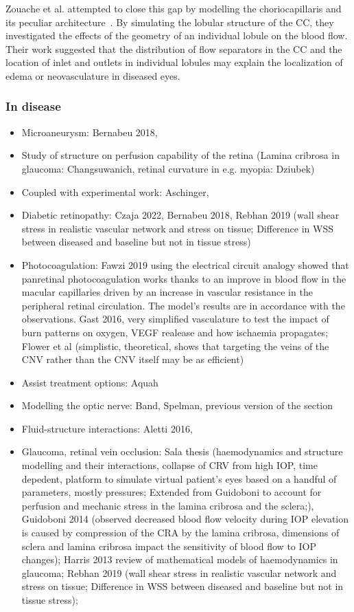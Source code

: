 \documentclass[12pt,a4paper]{journal}
\begin{document}
Zouache et al. attempted to close this gap by modelling the choriocapillaris and its peculiar architecture~\cite{Zouache_2015}.
By simulating the lobular structure of the CC, they investigated the effects of the geometry of an individual lobule on the blood flow.
Their work suggested that the distribution of flow separators in the CC and the location of inlet and outlets in individual lobules may explain the localization of edema or neovasculature in diseased eyes.


\subsubsection*{In disease}

\begin{itemize}
\item Microaneurysm: Bernabeu 2018,  
\item Study of structure on perfusion capability of the retina (Lamina cribrosa in glaucoma: Changsuwanich, retinal curvature in e.g. myopia: Dziubek)
\item Coupled with experimental work: Aschinger,
\item Diabetic retinopathy: Czaja 2022, Bernabeu 2018, Rebhan 2019 (wall shear stress in realistic vascular network and stress on tissue; Difference in WSS between diseased and baseline but not in tissue stress)
\item Photocoagulation: Fawzi 2019 using the electrical circuit analogy showed that panretinal photocoagulation works thanks to an improve in blood flow in the macular capillaries driven by an increase in vascular resistance in the peripheral retinal circulation. The model's results are in accordance with the observations. Gast 2016, very simplified vasculature to test the impact of burn patterns on oxygen, VEGF realease and how ischaemia propagates; Flower et al (simplistic, theoretical, shows that targeting the veins of the CNV rather than the CNV itself may be as efficient)
\item Assist treatment options: Aquah
\item Modelling the optic nerve: Band, Spelman, previous version of the section
\item Fluid-structure interactions: Aletti 2016, 
\item Glaucoma, retinal vein occlusion: Sala thesis (haemodynamics and structure modelling and their interactions, collapse of CRV from high IOP, time depedent, platform to simulate virtual patient's eyes based on a handful of parameters, mostly pressures; Extended from Guidoboni to account for perfusion and mechanic stress in the lamina cribrosa and the sclera;), Guidoboni 2014 (observed decreased blood flow velocity during IOP elevation is caused by compression of the CRA by the lamina cribrosa, dimensions of sclera and lamina cribrosa impact the sensitivity of blood flow to IOP changes); Harris 2013 review of mathematical models of haemodynamics in glaucoma; Rebhan 2019 (wall shear stress in realistic vascular network and stress on tissue; Difference in WSS between diseased and baseline but not in tissue stress);  
\end{itemize}
\newpage
\end{document}
